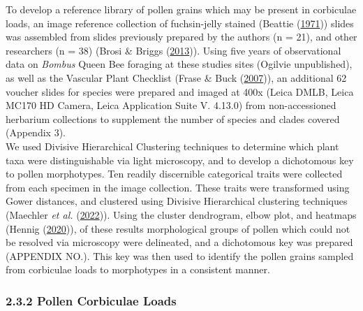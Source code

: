\documentclass[
]{article}
\begin{document}
To develop a reference library of pollen grains which may be present in
corbiculae loads, an image reference collection of fuchsin-jelly stained
(Beattie (\protect\hyperlink{ref-beattie1971technique}{1971})) slides
was assembled from slides previously prepared by the authors (n = 21),
and other researchers (n = 38) (Brosi \& Briggs
(\protect\hyperlink{ref-brosi2013single}{2013})). Using five years of
observational data on \emph{Bombus} Queen Bee foraging at these studies
sites (Ogilvie unpublished), as well as the Vascular Plant Checklist
(Frase \& Buck (\protect\hyperlink{ref-fraser2007vpc}{2007})), an
additional 62 voucher slides for species were prepared and imaged at
400x (Leica DMLB, Leica MC170 HD Camera, Leica Application Suite V.
4.13.0) from non-accessioned herbarium collections to supplement the
number of species and clades covered (Appendix 3).\\
We used Divisive Hierarchical Clustering techniques to determine which
plant taxa were distinguishable via light microscopy, and to develop a
dichotomous key to pollen morphotypes. Ten readily discernible
categorical traits were collected from each specimen in the image
collection. These traits were transformed using Gower distances, and
clustered using Divisive Hierarchical clustering techniques (Maechler
\emph{et al.} (\protect\hyperlink{ref-cluster2022}{2022})). Using the
cluster dendrogram, elbow plot, and heatmaps (Hennig
(\protect\hyperlink{ref-fpc2022}{2020})), of these results morphological
groups of pollen which could not be resolved via microscopy were
delineated, and a dichotomous key was prepared (APPENDIX NO.). This key
was then used to identify the pollen grains sampled from corbiculae
loads to morphotypes in a consistent manner.

\hypertarget{pollen-corbiculae-loads}{%
\subsubsection{2.3.2 \textbar{} Pollen Corbiculae
Loads}\label{pollen-corbiculae-loads}}
\end{document}
